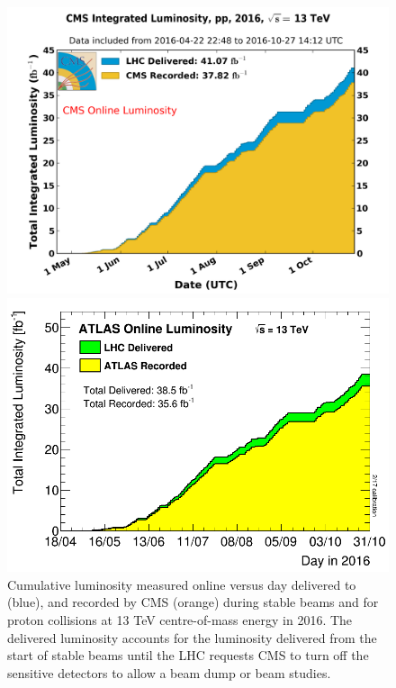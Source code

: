  \begin{figure}[ht]
 	\centering
	\begin{minipage}[b]{0.4\textwidth}
	\includegraphics[width=\textwidth]{2_ExperimentalSetup/Figures/int_lumi_per_day_cumulative_pp_2016OnlineLumi}
	\caption{Cumulative luminosity measured online versus day delivered to (blue), and recorded by CMS (orange) during stable beams and for proton collisions at 13 TeV centre-of-mass energy in 2016. The delivered luminosity accounts for the luminosity delivered from the start of stable beams until the LHC requests CMS to turn off the sensitive detectors to allow a beam dump or beam studies. }
    \end{minipage}
\hfill
\begin{minipage}[b]{0.4\textwidth}
\includegraphics[width=\textwidth]{2_ExperimentalSetup/Figures/sumLumiByDay}

\end{minipage}
\end{figure}
